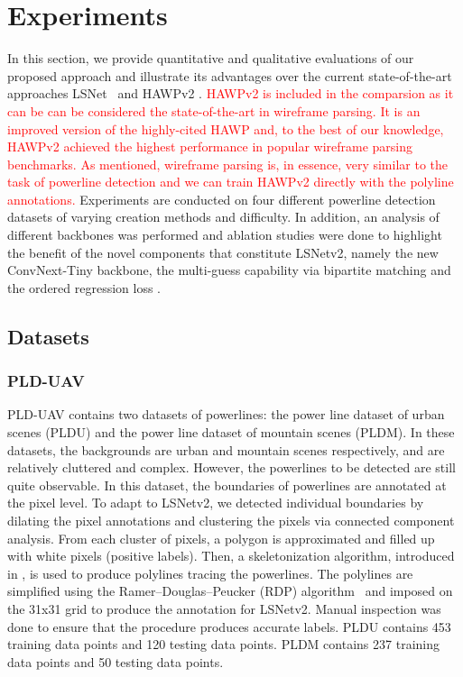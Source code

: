 \documentclass[journal]{IEEEtran}
\newcommand{\commentM}[1]{\textbf{\textcolor{blue}{M: #1}}}
\newcommand{\textK}[1]{\textcolor{red}{#1}}
\begin{document}
\section{Experiments}
In this section, we provide quantitative and qualitative evaluations of our proposed approach and illustrate its advantages over the current state-of-the-art approaches LSNet~\cite{Nguyen2020} and HAWPv2 \cite{hawpv2}. \textK{HAWPv2 is included in the comparsion as it can be can be considered the state-of-the-art in wireframe parsing. It is an improved version of the highly-cited HAWP and, to the best of our knowledge, HAWPv2 achieved the highest performance in popular wireframe parsing benchmarks. As mentioned, wireframe parsing is, in essence, very similar to the task of powerline detection and we can train HAWPv2 directly with the polyline annotations.} Experiments are conducted on four different powerline detection datasets of varying creation methods and difficulty. In addition, an analysis of different backbones was performed and ablation studies were done to highlight the benefit of the novel components that constitute LSNetv2, namely the new ConvNext-Tiny backbone, the multi-guess capability via bipartite matching and the ordered regression loss .

\subsection{Datasets}

\subsubsection{PLD-UAV}

PLD-UAV \cite{PLD_UAV} contains two datasets of powerlines: the power line dataset of urban scenes (PLDU) and the power line dataset of mountain scenes (PLDM). In these datasets, the backgrounds are urban and mountain scenes respectively, and are relatively cluttered and complex. However, the powerlines to be detected are still quite observable. In this dataset, the boundaries of powerlines are annotated at the pixel level. To adapt to LSNetv2, we detected individual boundaries by dilating the pixel annotations and clustering the pixels via connected component analysis. From each cluster of pixels, a polygon is approximated and filled up with white pixels (positive labels). Then, a skeletonization algorithm, introduced in \cite{skeleton}, is used to produce polylines tracing the powerlines. The polylines are simplified using the Ramer–Douglas–Peucker (RDP) algorithm~\cite{RDP} and imposed on the 31x31 grid to produce the annotation for LSNetv2. Manual inspection was done to ensure that the procedure produces accurate labels. PLDU contains 453 training data points and 120 testing data points. PLDM contains 237 training data points and 50 testing data points.
\end{document}

